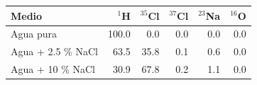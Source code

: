 \begin{tabular}{lrrrrr}
\toprule
Medio & $^1$H & $^{35}$Cl & $^{37}$Cl & $^{23}$Na & $^{16}$O \\
\midrule
Agua pura & 100.0 & 0.0 & 0.0 & 0.0 & 0.0 \\
Agua + 2.5 \% NaCl & 63.5 & 35.8 & 0.1 & 0.6 & 0.0 \\
Agua + 10 \% NaCl & 30.9 & 67.8 & 0.2 & 1.1 & 0.0 \\
\bottomrule
\end{tabular}
